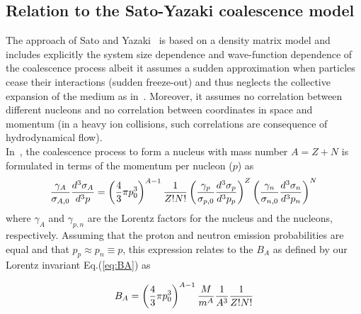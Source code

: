 \documentclass[a4paper,11pt]{scrartcl} %
\begin{document}
\begin{appendix}
\section{Relation to the Sato-Yazaki coalescence model}\label{appendix:Sato}
The approach of Sato and Yazaki~\cite{Sato:1981ez} is based on a density matrix model and includes explicitly the system size dependence and wave-function dependence of the coalescence process albeit it assumes a sudden approximation when particles cease their interactions (sudden freeze-out) and thus neglects the collective expansion of the medium as in~\cite{Scheibl:1998tk}. Moreover, it assumes no correlation between different nucleons and no correlation between coordinates in space and momentum (in a heavy ion collisions, such correlations are consequence of hydrodynamical flow). 
\\In~\cite{Sato:1981ez}, the coalescence process to form a nucleus with mass number $A = Z + N$ is formulated in terms of the momentum per nucleon ($p$) as
%
\begin{equation}
\frac{\gamma_{A}}{\sigma_{A,0}} \frac{d^{3}\sigma_{A}}{d^{3}p} =  \left( {4 \over 3} \pi p_{0}^{3}\right)^{A-1}\frac{1}{Z! N!} \left(\frac{\gamma_{p}}{\sigma_{p,0}} \frac{d^{3}\sigma_{p}}{d^{3}p_{p}}\right)^{Z} \left(\frac{\gamma_{n}}{\sigma_{n,0}} \frac{d^{3}\sigma_{n}}{d^{3}p_{n}}\right)^{N} 
\end{equation} 
%
where $\gamma_{A}$ and $\gamma_{p,n}$ are the Lorentz factors for the nucleus and the nucleons, respectively. 
Assuming that the proton and neutron emission probabilities are equal and that $p_{p} \approx p_{n} \equiv p$, this expression relates to the $B_{A}$ as defined by our Lorentz invariant Eq.(\ref{eq:BA}) as

\begin{equation}
B_{A} = \left({4 \over 3} \pi p_{0}^{3}\right)^{A-1} {M \over m^{A}} {1 \over A^{3}}{\frac{1}{Z! N!}}
\end{equation}


\end{appendix}
\end{document}
